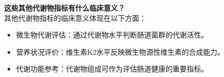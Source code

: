 \documentclass[UTF8]{ctexart}
\begin{document}
\begin{tcolorbox}[
    enhanced,
    colback=lightpurple!10, %
    colframe=white,  %
    arc=3mm,
    boxrule=0.5pt,
    width=\textwidth,
    top=8pt,
    bottom=8pt
]
{\small{\color{lightpurple}\faQuestionCircle}\quad \textbf{这些其他代谢物指标有什么临床意义？}\\
{\color{orange!50}\faComments}\quad 其他代谢物指标的临床意义体现在以下方面：
\begin{itemize}
    \item 微生物代谢评估：通过代谢物水平判断肠道菌群的代谢活性。
    \item 营养状况评价：维生素K2水平反映微生物源性维生素的合成能力。
    \item 代谢功能参考：代谢物组成可作为评估肠道健康的重要指标。
\end{itemize}
}
\end{tcolorbox}
\vspace{-0.5cm}
\end{document}
